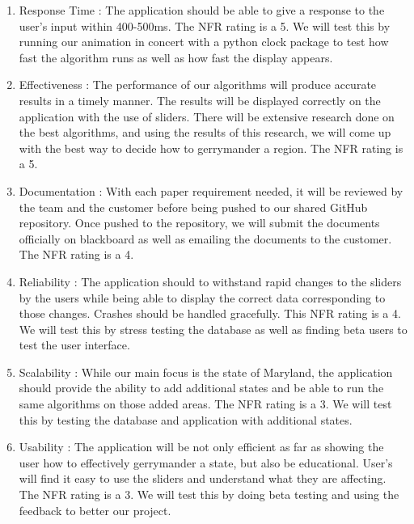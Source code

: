 \documentclass{article}
\begin{document}
\vspace{2.5mm}

\begin{addmargin}[2em]{0em}
\begin{enumerate}

\item Response Time : The application should be able to give a response to the user's input within 400-500ms. The NFR rating is a 5. We will test this by running our animation in concert with a python clock package to test how fast the algorithm runs as well as how fast the display appears.

\item Effectiveness : The performance of our algorithms will produce accurate results in a timely manner. The results will be displayed correctly on the application with the use of sliders. There will be extensive research done on the best algorithms, and using the results of this research, we will come up with the best way to decide how to gerrymander a region. The NFR rating is a 5.

\item Documentation : With each paper requirement needed, it will be reviewed by the team and the customer before being pushed to our shared GitHub repository. Once pushed to the repository, we will submit the documents officially on blackboard as well as emailing the documents to the customer. The NFR rating is a 4. 

\item Reliability : The application should to withstand rapid changes to the sliders by the users while being able to display the correct data corresponding to those changes. Crashes should be handled gracefully. This NFR rating is a 4. We will test this by stress testing the database as well as finding beta users to test the user interface.

\item Scalability : While our main focus is the state of Maryland, the application should provide the ability to add additional states and be able to run the same algorithms on those added areas. The NFR rating is a 3. We will test this by testing the database and application with additional states.

\item Usability : The application will be not only efficient as far as showing the user how to effectively gerrymander a state, but also be educational. User's will find it easy to use the sliders and understand what they are affecting. The NFR rating is a 3. We will test this by doing beta testing and using the feedback to better our project. 


\end{enumerate}
\end{addmargin}
\end{document}
